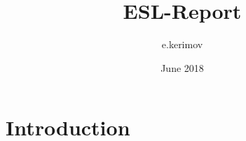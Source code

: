 \documentclass{article}
\title{ESL-Report}
\author{e.kerimov }
\date{June 2018}
\begin{document}
\maketitle

\section{Introduction}
\end{document}
